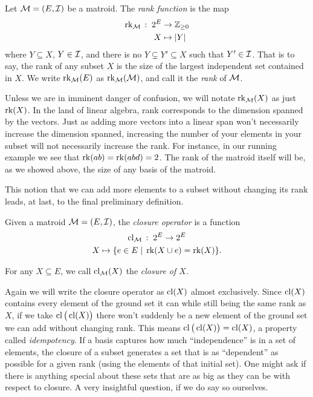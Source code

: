 \documentclass[12pt,oneside]{../../sfsuthesis}
\begin{document}
\begin{definition}[Rank]\th\label{def:rank}

    Let \( \mathcal{M} = (E, \mathcal{I}) \) be a matroid.
    The \emph{rank function} is the map
    \begin{align*}
        \operatorname{rk}_{\mathcal{M}} \, : \; 2^E & \to \mathbb{Z}_{\geq 0} \\
        X                   & \mapsto |Y|
    \end{align*}
    where \( Y \subseteq X \), \( Y \in \mathcal{I} \), and there is no \( Y \subsetneq Y' \subseteq X \) such that \( Y' \in \mathcal{I} \).
    That is to say, the rank of any subset \( X \) is the size of the largest independent set contained in \( X \).
    We write \( \operatorname{rk}_{\mathcal{M}}(E) \) as \( \operatorname{rk}_{\mathcal{M}}(\mathcal{M}) \), and call it the \emph{rank} of \( \mathcal{M} \).
\end{definition}
Unless we are in imminent danger of confusion, we will notate \( \operatorname{rk}_{\mathcal{M}}(X) \) as just \( \operatorname{rk}(X) \).
In the land of linear algebra, rank corresponds to the dimension spanned by the vectors.
Just as adding more vectors into a linear span won't necessarily increase the dimension spanned, increasing the number of your elements in your subset will not necessarily increase the rank.
For instance, in our running example we see that \( \operatorname{rk}(ab) = \operatorname{rk}(abd) = 2 \).
The rank of the matroid itself will be, as we showed above, the size of any basis of the matroid.

This notion that we can add more elements to a subset without changing its rank leads, at last, to the final preliminary definition.

\begin{definition}[Closure]\th\label{def:closure}
    Given a matroid \( \mathcal{M} = (E, \mathcal{I}) \), the \emph{closure operator} is a function
    \begin{gather*}
        \operatorname{cl}_{\mathcal{M}} \, : \; 2^E \to 2^E \\
        X \mapsto \{ e \in E \; | \; \operatorname{rk}(X \cup e) = \operatorname{rk}(X) \}.
    \end{gather*}

    For any \( X \subseteq E \), we call \( \operatorname{cl}_{\mathcal{M}}(X) \) the \emph{closure of \( X \)}.

\end{definition}

Again we will write the closure operator as \( \operatorname{cl}(X) \) almost exclusively.
Since \( \operatorname{cl}(X) \) contains every element of the ground set it can while still being the same rank as \( X \), if we take \( \operatorname{cl}\big(\operatorname{cl}(X)\big) \) there won't suddenly be a new element of the ground set we can add without changing rank.
This means \( \operatorname{cl}\big(\operatorname{cl}(X)\big) = \operatorname{cl}(X) \), a property called \emph{idempotency}.
If a basis captures how much ``independence'' is in a set of elements, the closure of a subset generates a set that is as ``dependent'' as possible for a given rank (using the elements of that initial set).
One might ask if there is anything special about these sets that are as big as they can be with respect to closure.
A very insightful question, if we do say so ourselves.
\end{document}

